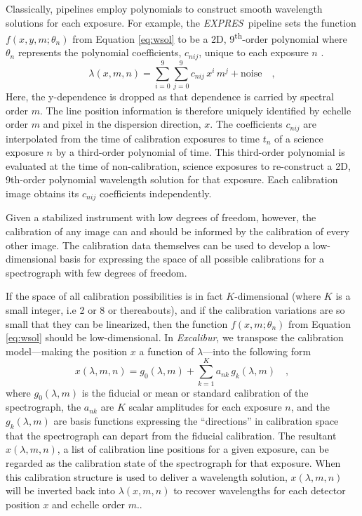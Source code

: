 \documentclass[modern]{aastex63}
\newcommand{\project}[1]{\textsl{#1}}
\newcommand{\name}{\project{Excalibur}}
\newcommand{\acronym}[1]{{\small{#1}}}
\newcommand{\expres}{\project{\acronym{EXPRES}}}
\begin{document}
Classically, pipelines employ polynomials to construct smooth wavelength solutions for each exposure.  For example, the \expres\ pipeline sets the function $f(x,y,m;\theta_{n})$ from Equation \ref{eq:wsol} to be a 2D, 9\textsuperscript{th}-order polynomial where $\theta_{n}$ represents the polynomial coefficients, $c_{nij}$, unique to each exposure $n$ \citep{petersburg2020}.
\begin{equation}
\lambda(x,m,n) = \sum_{i=0}^9\sum_{j=0}^9 c_{nij}\, x^i\,m^j + \mathrm{noise}
\quad ,
\label{eq:poly_wsol}
\end{equation}
Here, the y-dependence is dropped as that dependence is carried by spectral order $m$.  The line position information is therefore uniquely identified by echelle order $m$ and pixel in the dispersion direction, $x$.  The coefficients $c_{nij}$ are interpolated from the time of calibration exposures to time $t_n$ of a science exposure $n$ by a third-order polynomial of time.  This third-order polynomial is evaluated at the time of non-calibration, science exposures to re-construct a 2D, 9th-order polynomial wavelength solution for that exposure.  Each calibration image obtains its $c_{nij}$ coefficients independently.

Given a stabilized instrument with low degrees of freedom, however,  the calibration of any image can and should be informed by the calibration of every other image.  The calibration data themselves can be used to develop a low-dimensional basis for expressing the space of all possible calibrations for a spectrograph with few degrees of freedom.

If the space of all calibration possibilities is in fact $K$-dimensional (where $K$ is a small integer, i.e 2 or 8 or thereabouts), and if the calibration variations are so small that they can be linearized, then the function $f(x,m;\theta_{n})$ from Equation \ref{eq:wsol} should be low-dimensional.  In \name, we transpose the calibration model---making the position $x$ a function of $\lambda$---into the following form
\begin{equation}
x(\lambda,m,n) = g_0(\lambda,m) + \sum_{k=1}^K a_{nk}\,g_k(\lambda,m)
\quad ,
\label{eq:excl_wsol}
\end{equation}
where
$g_0(\lambda,m)$ is the fiducial or mean or standard calibration of the spectrograph,
the $a_{nk}$ are $K$ scalar amplitudes for each exposure $n$,
and the $g_k(\lambda,m)$ are basis functions expressing the ``directions'' in calibration space that the spectrograph can depart from the fiducial calibration.  The resultant $x(\lambda,m,n)$, a list of calibration line positions for a given exposure, can be regarded as the calibration state of the spectrograph for that exposure.  When this calibration structure is used to deliver a wavelength solution, $x(\lambda,m,n)$ will be inverted back into $\lambda(x,m,n)$ to recover wavelengths for each detector position $x$ and echelle order $m$..
\end{document}
